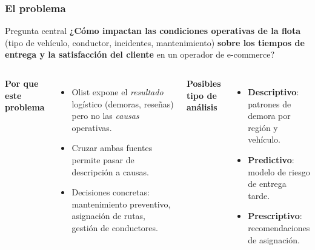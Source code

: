 \documentclass[aspectratio=169,11pt]{beamer}
\begin{document}
\begin{frame}

\frametitle{El problema}

\begin{block}{Pregunta central}
\textbf{¿Cómo impactan las condiciones operativas de la flota}
(tipo de vehículo, conductor, incidentes, mantenimiento)
\textbf{sobre los tiempos de entrega y la satisfacción del cliente}
en un operador de e-commerce?
\end{block}

\vspace{4mm}

\begin{columns}[T]

\textbf{Por que este problema}
\begin{itemize}
\item Olist expone el \textit{resultado} logístico (demoras, reseñas)
pero no las \textit{causas} operativas.
\item Cruzar ambas fuentes permite pasar de descripción a causas.
\item Decisiones concretas: mantenimiento preventivo, asignación
de rutas, gestión de conductores.
\end{itemize}

\textbf{Posibles tipo de análisis}
\begin{itemize}
\item \textbf{Descriptivo}: patrones de demora por región y vehículo.
\item \textbf{Predictivo}: modelo de riesgo de entrega tarde.
\item \textbf{Prescriptivo}: recomendaciones de asignación.
\end{itemize}

\end{columns}


\end{frame}
\end{document}
